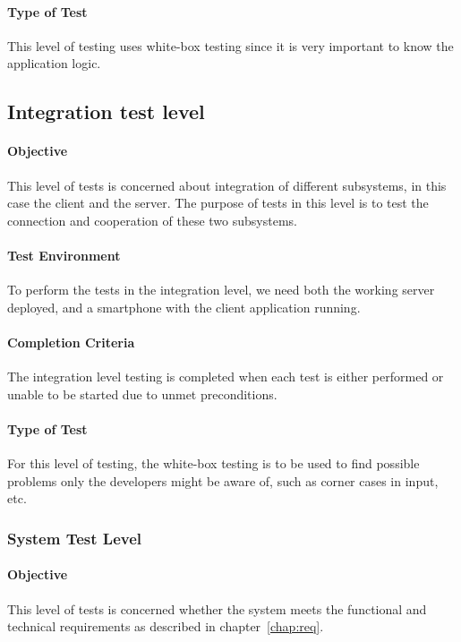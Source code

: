 \documentclass[11pt]{book}
\begin{document}
\paragraph{Type of Test}
This level of testing uses white-box testing since it is very important to know the application logic.


\subsection{Integration test level}

\paragraph{Objective}
This level of tests is concerned about integration of different subsystems, in this case the client and the server. The purpose of tests in this level is to test the connection and cooperation of these two subsystems.

\paragraph{Test Environment}
To perform the tests in the integration level, we need both the working server deployed, and a smartphone with the client application running.

\paragraph{Completion Criteria}
The integration level testing is completed when each test is either performed or unable to be started due to unmet preconditions.

\paragraph{Type of Test}
For this level of testing, the white-box testing is to be used to find possible problems only the developers might be aware of, such as corner cases in input, etc.


\subsubsection{System Test Level}

\paragraph{Objective}
This level of tests is concerned whether the system meets the functional and technical requirements as described in chapter~\ref{chap:req}.
\end{document}
